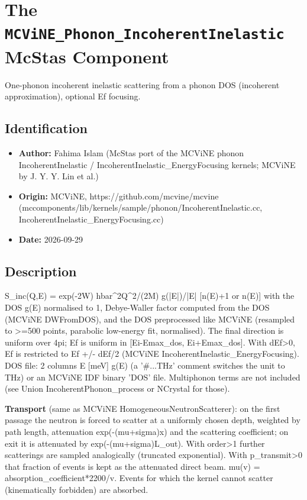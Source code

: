 \section{The \texttt{MCViNE\_Phonon\_IncoherentInelastic} McStas Component}
One-phonon incoherent inelastic scattering from a phonon DOS (incoherent approximation), optional Ef focusing.

\subsection*{Identification}
\begin{itemize}
  \item \textbf{Author:} Fahima Islam (McStas port of the MCViNE phonon IncoherentInelastic / IncoherentInelastic\_EnergyFocusing kernels; MCViNE by J. Y. Y. Lin et al.)
  \item \textbf{Origin:} MCViNE, https://github.com/mcvine/mcvine (mccomponents/lib/kernels/sample/phonon/IncoherentInelastic.cc, IncoherentInelastic\_EnergyFocusing.cc)
  \item \textbf{Date:} 2026-09-29
\end{itemize}

\subsection*{Description}
S\_inc(Q,E) = exp(-2W) hbar\textasciicircum{}2Q\textasciicircum{}2/(2M) g(|E|)/|E| [n(E)+1 or n(E)] with the DOS g(E) normalised to 1, Debye-Waller factor computed from the DOS (MCViNE DWFromDOS), and the DOS preprocessed like MCViNE (resampled to \textgreater{}=500 points, parabolic low-energy fit, normalised). The final direction is uniform over 4pi; Ef is uniform in [Ei-Emax\_dos, Ei+Emax\_dos]. With dEf\textgreater{}0, Ef is restricted to Ef +/- dEf/2 (MCViNE IncoherentInelastic\_EnergyFocusing). DOS file: 2 columns E [meV] g(E) (a '\#...THz' comment switches the unit to THz) or an MCViNE IDF binary 'DOS' file. Multiphonon terms are not included (see Union IncoherentPhonon\_process or NCrystal for those).

\textbf{Transport} (same as MCViNE HomogeneousNeutronScatterer): on the first passage the neutron is forced to scatter at a uniformly chosen depth, weighted by path length, attenuation exp(-(mu+sigma)x) and the scattering coefficient; on exit it is attenuated by exp(-(mu+sigma)L\_out). With order\textgreater{}1 further scatterings are sampled analogically (truncated exponential). With p\_transmit\textgreater{}0 that fraction of events is kept as the attenuated direct beam. mu(v) = absorption\_coefficient*2200/v. Events for which the kernel cannot scatter (kinematically forbidden) are absorbed.


